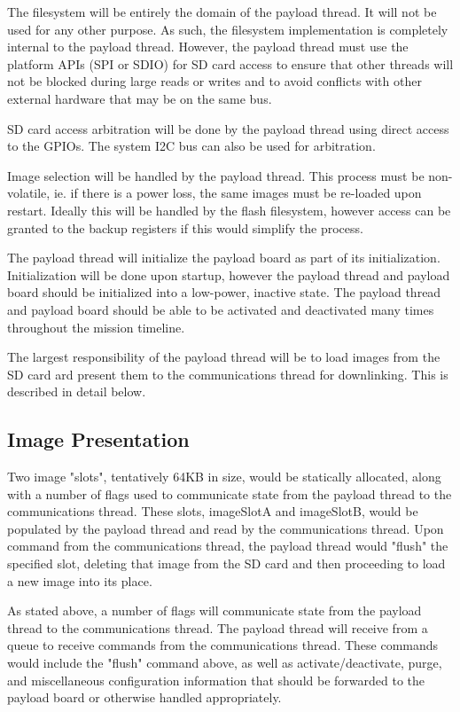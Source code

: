 \documentclass{article}
\begin{document}
The filesystem will be entirely the domain of the payload thread. It will not be
used for any other purpose. As such, the filesystem implementation is completely
internal to the payload thread. However, the payload thread must use the
platform APIs (SPI or SDIO) for SD card access to ensure that other threads will not be blocked
during large reads or writes and to avoid conflicts with other external hardware
that may be on the same bus.

SD card access arbitration will be done by the payload thread using direct access
to the GPIOs. The system I2C bus can also be used for arbitration.

Image selection will be handled by the payload thread. This process must be
non-volatile, ie. if there is a power loss, the same images must be re-loaded
upon restart. Ideally this will be handled by the flash filesystem, however
access can be granted to the backup registers if this would simplify the
process.

The payload thread will initialize the payload board as part of its initialization.
Initialization will be done upon startup, however the payload thread and payload
board should be initialized into a low-power, inactive state. The payload thread
and payload board should be able to be activated and deactivated many times
throughout the mission timeline.

The largest responsibility of the payload thread will be to load images from 
the SD card ard present them to the communications thread for downlinking. This
is described in detail below.

\subsection{Image Presentation}
Two image "slots", tentatively 64KB in size, would be statically allocated,
along with a number of flags used to communicate state from the payload thread
to the communications thread. These slots, imageSlotA and imageSlotB, would be
populated by the payload thread and read by the communications thread. Upon
command from the communications thread, the payload thread would "flush" the
specified slot, deleting that image from the SD card and then proceeding to
load a new image into its place.

As stated above, a number of flags will communicate state from the payload
thread to the communications thread. The payload thread will receive from a 
queue to receive commands from the communications thread. These commands would
include the "flush" command above, as well as activate/deactivate, purge, and
miscellaneous configuration information that should be forwarded to the payload
board or otherwise handled appropriately.
\end{document}
